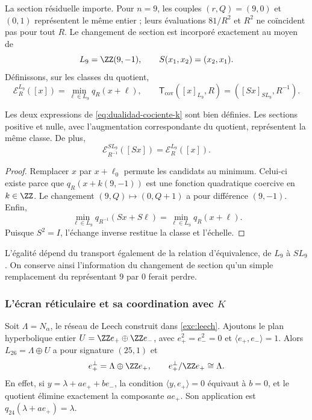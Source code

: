 La section résiduelle importe. Pour \(n=9\), les couples
\((r,Q)=(9,0)\) et \((0,1)\) représentent le même entier ;
leurs évaluations \(81/R^2\) et \(R^2\) ne coïncident pas pour tout
\(R\). Le changement de section est incorporé exactement au moyen de
\[
 L_9=\ZZ(9,-1),\qquad S(x_1,x_2)=(x_2,x_1).
\]
Définissons, sur les classes du quotient,
\begin{equation}
 \mathcal E_R^{L_9}([x])=\min_{\ell\in L_9}q_R(x+\ell),
 \qquad
 \mathsf T_{\mathrm{cov}}([x]_{L_9},R)
       =([Sx]_{SL_9},R^{-1}).
 \label{eq:dualidad-cociente-k}
\end{equation}

\begin{proposition}
Les deux expressions de \eqref{eq:dualidad-cociente-k} sont bien
définies. Les sections positive et nulle, avec l'augmentation
correspondante du quotient, représentent la même classe. De plus,
\[
 \mathcal E_{R^{-1}}^{SL_9}([Sx])=\mathcal E_R^{L_9}([x]).
\]
\end{proposition}
\begin{proof}
Remplacer \(x\) par \(x+\ell_0\) permute les candidats au minimum.
Celui-ci existe parce que \(q_R(x+k(9,-1))\) est une fonction quadratique coercive
en \(k\in\ZZ\). Le changement \((9,Q)\mapsto(0,Q+1)\)
a pour différence \((9,-1)\). Enfin,
\[
 \min_{\ell\in L_9}q_{R^{-1}}(Sx+S\ell)
 =\min_{\ell\in L_9}q_R(x+\ell).
\]
Puisque \(S^2=I\), l'échange inverse restitue la classe et l'échelle.
\end{proof}

L'égalité dépend du transport également de la relation d'équivalence,
de \(L_9\) à \(SL_9\). On conserve ainsi l'information du changement
de section qu'un simple remplacement du représentant \(9\) par
\(0\) ferait perdre.

\subsubsection{L'écran réticulaire et sa coordination avec \(K\)}

Soit \(\Lambda=N_\alpha\), le réseau de Leech construit dans
\ref{exc:leech}. Ajoutons le plan hyperbolique entier
\(U=\ZZ e_+\oplus\ZZ e_-\), avec
\(e_+^2=e_-^2=0\) et \(\langle e_+,e_-\rangle=1\).
Alors \(L_{26}=\Lambda\oplus U\) a pour signature \((25,1)\) et
\[
 e_+^\perp=\Lambda\oplus\ZZ e_+,
 \qquad e_+^\perp/\ZZ e_+\cong\Lambda.
\]
En effet, si \(y=\lambda+ae_++be_-\), la condition
\(\langle y,e_+\rangle=0\) équivaut à \(b=0\), et le quotient
élimine exactement la composante \(ae_+\). Son application est
\(q_{24}(\lambda+ae_+)=\lambda\).

